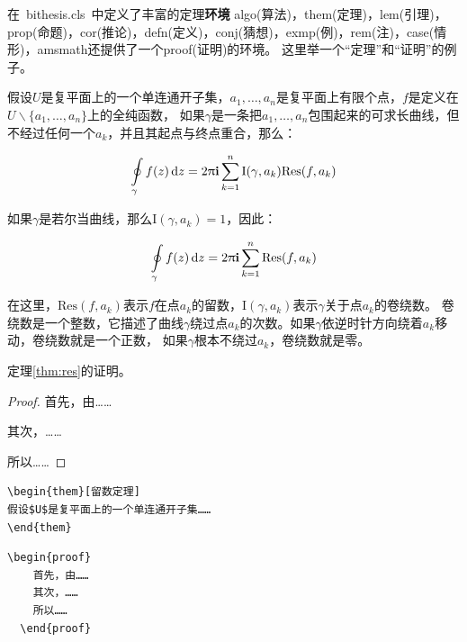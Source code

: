 在~bithesis.cls~中定义了丰富的定理\textbf{环境}
algo(算法)，them(定理)，lem(引理)，prop(命题)，cor(推论)，defn(定义)，conj(猜想)，exmp(例)，rem(注)，case(情形)，amsmath还提供了一个proof(证明)的环境。
这里举一个``定理''和``证明''的例子。
\begin{them}[留数定理]
\label{thm:res}
  假设$U$是复平面上的一个单连通开子集，$a_1,\ldots,a_n$是复平面上有限个点，$f$是定义在$U\backslash \{a_1,\ldots,a_n\}$上的全纯函数，
  如果$\gamma$是一条把$a_1,\ldots,a_n$包围起来的可求长曲线，但不经过任何一个$a_k$，并且其起点与终点重合，那么：

  \begin{equation}
    \label{eq:res}
    \ointop_{\gamma}f(z)\,\mathrm{d}z = 2\uppi\mathbf{i}\sum^n_{k=1}\mathrm{I}(\gamma,a_k)\mathrm{Res}(f,a_k)
  \end{equation}

  如果$\gamma$是若尔当曲线，那么$\mathrm{I}(\gamma, a_k)=1$，因此：

  \begin{equation}
    \label{eq:resthm}
    \ointop_{\gamma}f(z)\,\mathrm{d}z = 2\uppi\mathbf{i}\sum^n_{k=1}\mathrm{Res}(f,a_k)
  \end{equation}

  在这里，$\mathrm{Res}(f, a_k)$表示$f$在点$a_k$的留数，$\mathrm{I}(\gamma,a_k)$表示$\gamma$关于点$a_k$的卷绕数。
  卷绕数是一个整数，它描述了曲线$\gamma$绕过点$a_k$的次数。如果$\gamma$依逆时针方向绕着$a_k$移动，卷绕数就是一个正数，
  如果$\gamma$根本不绕过$a_k$，卷绕数就是零。

  定理\ref{thm:res}的证明。
  
  \begin{proof}
    首先，由……

    其次，……

    所以……
  \end{proof}
  
\end{them}

\begin{lstlisting}[language={[LaTeX]TeX}, caption={定理环境}]
\begin{them}[留数定理]
假设$U$是复平面上的一个单连通开子集……
\end{them}
\end{lstlisting}

\begin{lstlisting}[language={[LaTeX]TeX}, caption={证明环境}]
  \begin{proof}
    首先，由……
    其次，……
    所以……
  \end{proof}
\end{lstlisting}

